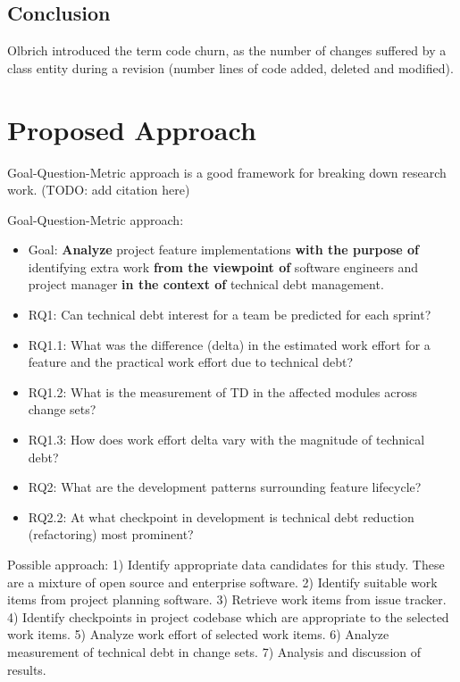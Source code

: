 \documentclass{mprop}
\begin{document}

\subsection{Conclusion}

Olbrich \cite{Olbrich2009} introduced the term code churn, as the number of
changes suffered by a class entity during a revision (number lines of code
added, deleted and modified).


\section{Proposed Approach}

Goal-Question-Metric approach is a good framework for breaking down research
work. (TODO: add citation here)

Goal-Question-Metric approach:
\begin{itemize}
	\item Goal: \textbf{Analyze} project feature implementations \textbf{with
		      the purpose of} identifying extra work \textbf{from the viewpoint of}
	      software engineers and project manager \textbf{in the context of}
	      technical debt management.
	\item RQ1: Can technical debt interest for a team be predicted for each
	      sprint?
	\item RQ1.1: What was the difference (delta) in the estimated work effort
	      for a feature and the practical work effort due to technical debt?
	\item RQ1.2: What is the measurement of TD in the affected modules across
	      change sets?
	\item RQ1.3: How does work effort delta vary with the magnitude of
	      technical debt?
	\item RQ2: What are the development patterns surrounding feature
	      lifecycle?
	\item RQ2.2: At what checkpoint in development is technical debt reduction
	      (refactoring)  most prominent?
\end{itemize}

Possible approach: 1) Identify appropriate data candidates for this study. These
are a mixture of open source and enterprise software. 2) Identify suitable work
items from project planning software. 3) Retrieve work items from issue tracker.
4) Identify checkpoints in project codebase which are appropriate to the
selected work items. 5) Analyze work effort of selected work items. 6) Analyze
measurement of technical debt in change sets. 7) Analysis and discussion of
results.
\end{document}
